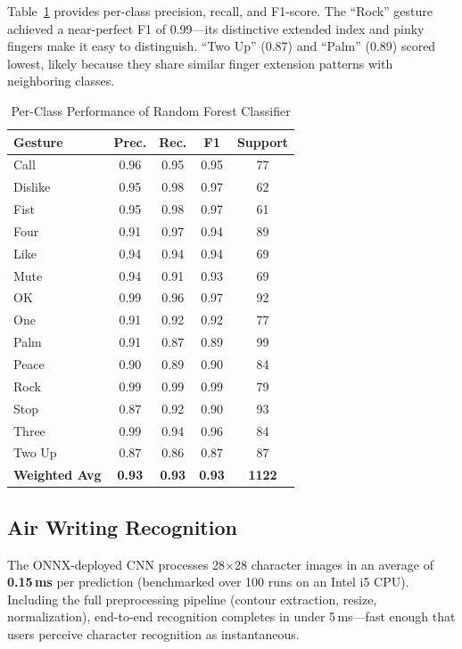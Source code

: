 \documentclass[conference]{IEEEtran}
\begin{document}
Table~\ref{tab:perclass} provides per-class precision, recall, and F1-score. The ``Rock'' gesture achieved a near-perfect F1 of 0.99---its distinctive extended index and pinky fingers make it easy to distinguish. ``Two Up'' (0.87) and ``Palm'' (0.89) scored lowest, likely because they share similar finger extension patterns with neighboring classes.

\begin{table}[htbp]
\caption{Per-Class Performance of Random Forest Classifier}
\label{tab:perclass}
\centering
\begin{tabular}{@{}lcccc@{}}
\toprule
\textbf{Gesture} & \textbf{Prec.} & \textbf{Rec.} & \textbf{F1} & \textbf{Support} \\
\midrule
Call & 0.96 & 0.95 & 0.95 & 77 \\
Dislike & 0.95 & 0.98 & 0.97 & 62 \\
Fist & 0.95 & 0.98 & 0.97 & 61 \\
Four & 0.91 & 0.97 & 0.94 & 89 \\
Like & 0.94 & 0.94 & 0.94 & 69 \\
Mute & 0.94 & 0.91 & 0.93 & 69 \\
OK & 0.99 & 0.96 & 0.97 & 92 \\
One & 0.91 & 0.92 & 0.92 & 77 \\
Palm & 0.91 & 0.87 & 0.89 & 99 \\
Peace & 0.90 & 0.89 & 0.90 & 84 \\
Rock & 0.99 & 0.99 & 0.99 & 79 \\
Stop & 0.87 & 0.92 & 0.90 & 93 \\
Three & 0.99 & 0.94 & 0.96 & 84 \\
Two Up & 0.87 & 0.86 & 0.87 & 87 \\
\midrule
\textbf{Weighted Avg} & \textbf{0.93} & \textbf{0.93} & \textbf{0.93} & \textbf{1122} \\
\bottomrule
\end{tabular}
\end{table}

\subsection{Air Writing Recognition}

The ONNX-deployed CNN processes 28$\times$28 character images in an average of \textbf{0.15\,ms} per prediction (benchmarked over 100 runs on an Intel i5 CPU). Including the full preprocessing pipeline (contour extraction, resize, normalization), end-to-end recognition completes in under 5\,ms---fast enough that users perceive character recognition as instantaneous.
\end{document}
